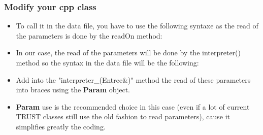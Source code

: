\documentclass[10pt, hyperref={unicode=true,pdfusetitle, bookmarks=true,bookmarksnumbered=false,bookmarksopen=false, breaklinks=false,pdfborder={0 0 1},backref=true,colorlinks=true,linkcolor=darkblue,pageanchor, urlcolor=darkblue}]{beamer}
\begin{document}
\begin{frame}
\frametitle{Modify your cpp class}
\begin{block}{}

\begin{itemize}
\item To call it in the data file, you have to use the following syntaxe as the read of the parameters is done by the readOn method:
\begin{center}
\end{center}

\item In our case, the read of the parameters will be done by the interpreter() method so the syntax in the data file will be the following:
\begin{center}
\end{center}

\item Add into the "interpreter\_(Entree\&)" method the read of these parameters into braces using the \textbf{Param} object.

\item \textbf{Param} use is the recommended choice in this case (even if a lot of
current TRUST classes still use the old fashion to read parameters), cause it
simplifies greatly the coding.
\end{itemize}

\end{block}
\end{frame}
\end{document}
